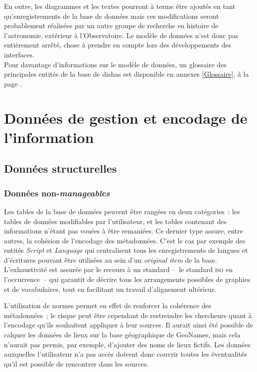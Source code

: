 \documentclass[a4paper,12pt,twoside]{book}
\newcommand{\eng}{\emph}
\newcommand{\oi}{\eng{original item}\xspace}
\newcommand{\dishas}{\gls{dishas}\xspace}
\begin{document}
En outre, les diagrammes et les textes pourront à terme être ajoutés en tant qu'enregistrements de la base de données mais ces modifications seront probablement réalisées par un autre groupe de recherche en histoire de l'astronomie, extérieur à l'Observatoire. Le modèle de données n'est donc pas entièrement arrêté, chose à prendre en compte lors des développements des interfaces.\\

Pour davantage d'informations sur le modèle de données, un glossaire des principales entités de la base de \dishas est disponible en annexes \ref{Glossaire}, à la page \pageref{Glossaire}.

	\section{Données de gestion et encodage de l'information}
		\subsection{Données structurelles}
			\subsubsection{Données non-\emph{manageables}}
Les tables de la base de données peuvent être rangées en deux catégories~: les tables de données modifiables par l'utilisateur, et les tables contenant des informations n'étant pas vouées à être remaniées. Ce dernier type assure, entre autres, la cohésion de l'encodage des métadonnées. C'est le cas par exemple des entités \eng{Script} et \eng{Language} qui centralisent tous les enregistrements de langues et d'écritures pouvant être utilisées au sein d'un \oi de la base. L'exhaustivité est assurée par le recours à un standard –~le standard \textsc{iso} en l'occurrence~– qui garantit de décrire tous les arrangements possibles de graphies et de vocabulaires, tout en facilitant un travail d'alignement ultérieur.

L'utilisation de normes permet en effet de renforcer la cohérence des métadonnées~; le risque peut être cependant de restreindre les chercheurs quant à l'encodage qu'ils souhaitent appliquer à leur sources. Il aurait ainsi été possible de calquer les données de lieux sur la base géographique de GeoNames, mais cela n'aurait pas permis, par exemple, d'ajouter des noms de lieux fictifs. Les données auxquelles l'utilisateur n'a pas accès doivent donc couvrir toutes les éventualités qu'il est possible de rencontrer dans les sources.
\end{document}

